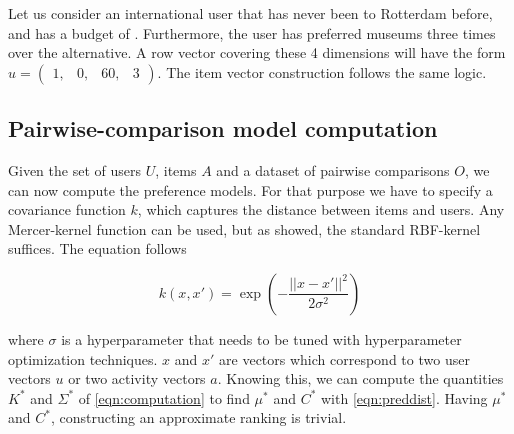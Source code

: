 \documentclass[11pt,a4paper,oneside]{article}
\begin{document}
Let us consider an international user that has never been to Rotterdam before, and has a budget of . Furthermore, the user has preferred museums three times over the alternative. A row vector covering these 4 dimensions will have the form $u = \left(\begin{smallmatrix} 1, & 0, & 60, & 3 \end{smallmatrix}\right)$. The item vector construction follows the same logic. 

\subsection{Pairwise-comparison model computation}
Given the set of users $U$, items $A$ and a dataset of pairwise comparisons $O$, we can now compute the preference models. For that purpose we have to specify a covariance function $k$, which captures the distance between items and users. Any Mercer-kernel function can be used, but as \citeauthor{guo_GaussianProcessPreference_2010} showed, the standard RBF-kernel suffices. The equation follows 

\begin{equation}
k(x, x') = \exp\left(-\frac{|| x - x' ||^2}{2\sigma^2}\right)
\end{equation}

where $\sigma$ is a hyperparameter that needs to be tuned with hyperparameter optimization techniques. $x$ and $x'$ are vectors which correspond to two user vectors $u$ or two activity vectors $a$. Knowing this, we can compute the quantities $K^*$ and $\Sigma^*$ of \autoref{eqn:computation} to find $\mu^*$ and $C^*$ with \autoref{eqn:preddist}. Having $\mu^*$ and $C^*$, constructing an approximate ranking is trivial. 
\end{document}
